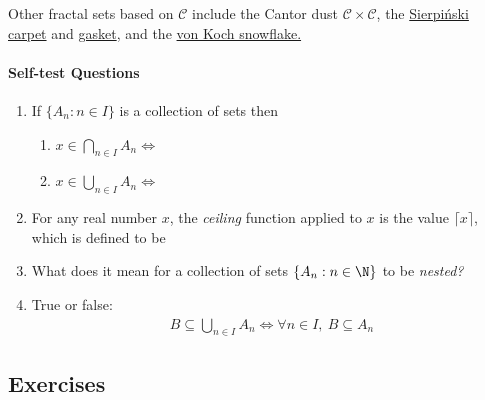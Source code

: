 \noindent Other fractal sets based on $\mathcal C$ include the Cantor dust $\mathcal C\times\mathcal C$, the \href{http://en.wikipedia.org/wiki/Sierpinski_carpet}{Sierpi\'nski carpet} and \href{http://en.wikipedia.org/wiki/Sierpinski_triangle}{gasket}, and the \href{http://en.wikipedia.org/wiki/Koch_snowflake}{von Koch snowflake.}



\paragraph{Self-test Questions}

	\begin{enumerate}
    \item If $\{A_n:n\in I\}$ is a collection of sets then
    \begin{enumerate}
      \item $x\in \bigcap_{n\in I}A_n\iff$ \underline{\phantom{$\exists n\in I:x\in A_n$,\qquad}}
      \item $x\in \bigcup_{n\in I}A_n\iff$ \underline{\phantom{$\forall n\in I:x\in A_n$,\qquad}}
  \end{enumerate}
    \item For any real number $x$, the \emph{ceiling} function applied to $x$ is the value $\lceil x\rceil$, which is defined to be \underline{\phantom{the least integer greater than or equal to $x$\qquad}}
    \item What does it mean for a collection of sets $\{A_n:n\in\N\}$ to be \emph{nested?}
    \item True or false:
    \begin{gather*}
    B\subseteq \bigcup_{n\in I}A_n\iff \forall n\in I,\ B\subseteq A_n
    \end{gather*}
  \end{enumerate}

\subsection*{Exercises}

